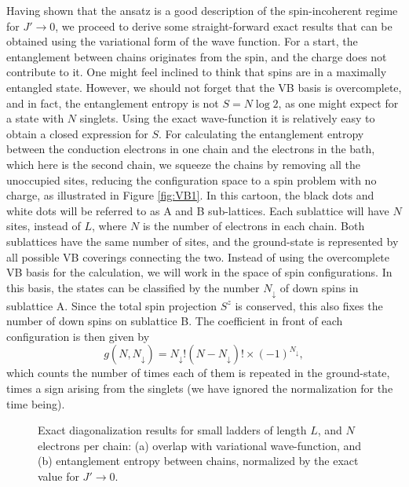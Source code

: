 \documentclass[article,11pt]{revtex4}
\begin{document}
Having shown that the ansatz is a good description of the spin-incoherent regime for $J' \rightarrow 0$, we proceed to derive some straight-forward exact results that can be obtained using the variational form of the wave function. For a start, the entanglement between chains originates from the spin, and the charge does not contribute to it. One might feel inclined to think that spins are in a maximally entangled state. However, we should not forget that the VB basis is overcomplete, and in fact, the entanglement entropy is not $S=N\log2$, as one might expect for a state with $N$ singlets. Using the exact wave-function it is relatively easy to obtain a closed expression for $S$. For calculating the entanglement entropy between the conduction electrons in one chain and the electrons in the bath, which here is the second chain, we squeeze the chains by removing all the unoccupied sites, reducing the configuration space to a spin problem with no charge, as illustrated in Figure \ref{fig:VB1}. In this cartoon, the black dots and white dots will be referred to as A and B sub-lattices. Each sublattice will have $N$ sites, instead of $L$, where $N$ is the number of electrons in each chain. Both sublattices have the same number of sites, and the ground-state is represented by all possible VB coverings connecting the two.  
Instead of using the overcomplete  VB basis for the calculation, we will work in the space of spin configurations. In this basis, the states can be classified by the number $N_\downarrow$ of down spins in sublattice A. Since the total spin projection $S^z$ is conserved, this also fixes the number of down spins on sublattice B. The coefficient in front of each configuration is then given by
\begin{equation}
g(N,N_\downarrow)=N_{\downarrow} !(N-N_{\downarrow})! \times (-1)^{N_{\downarrow}},
\label{deg}
\end{equation}
which counts the number of times each of them is repeated in the ground-state, times a sign arising from the singlets (we have ignored the normalization for the time being).

\begin{centering}
\begin{figure}
\caption{Exact diagonalization results for small ladders of length $L$, and $N$ electrons per chain: (a) overlap with variational wave-function, and (b) entanglement entropy between chains, normalized by the exact value for $J'\rightarrow0$.} 
\label{fig:ladder}
\end{figure}
\end{centering}
\end{document}
